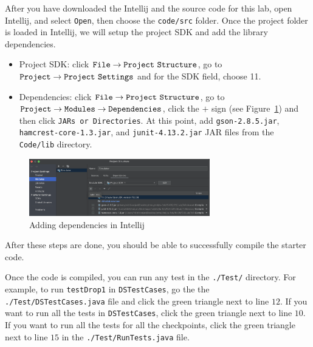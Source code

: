 After you have downloaded the Intellij and the source code for this lab, open Intellij, and select \texttt{Open}, then choose the \texttt{code/src} folder. 
Once the project folder is loaded in Intellij, we will setup the project SDK and add the library dependencies.
\begin{itemize}
\item Project SDK: click $\tt{File} \to \tt{Project \ Structure}$, go to $\tt{Project} \to \tt{Project \ Settings}$ and for the SDK field, choose 11.
\item Dependencies: click $\tt{File} \to \tt{Project \ Structure}$, go to $\tt{Project} \to \tt{Modules} \to \tt{Dependencies}$, click the $+$ sign (see Figure~\ref{fig:dependencies}) and then click \texttt{JARs or Directories}. At this point, add \texttt{gson-2.8.5.jar}, \texttt{hamcrest-core-1.3.jar}, and \texttt{junit-4.13.2.jar} JAR files from the \texttt{Code/lib} directory.
\end{itemize}
\begin{figure}[H]
\centering
\includegraphics[width=0.7\textwidth]{dependencies.png}
\caption{Adding dependencies in Intellij}
\label{fig:dependencies}
\end{figure}
After these steps are done, you should be able to successfully compile the starter code.

Once the code is compiled, you can run any test in the \texttt{./Test/} directory. For example, to run \texttt{testDrop1} in \texttt{DSTestCases}, go the the \texttt{./Test/DSTestCases.java} file and click the green triangle next to line $12$. If you want to run all the tests in \texttt{DSTestCases}, click the green triangle next to line $10$. If you want to run all the tests for all the checkpoints, click the green triangle next to line $15$ in the \texttt{./Test/RunTests.java} file.



